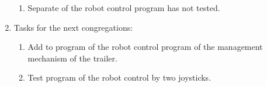 \begin{enumerate}
\begin{enumerate}
		\item Separate of the robot control program has not tested.
		
	\end{enumerate}
	
	\item Tasks for the next congregations:
	\begin{enumerate}
		\item Add to program of the robot control program of the management mechanism of the trailer.
		
		\item Test program of the robot control by two joysticks.
		
	\end{enumerate}     
\end{enumerate}
\fillpage

